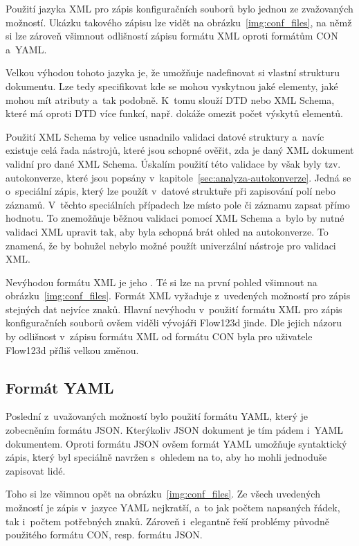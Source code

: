 \documentclass[FM,bw,DP]{tulthesis}
\begin{document}
Použití jazyka \gls{XML} pro zápis konfiguračních souborů bylo jednou ze zvažovaných možností. Ukázku takového zápisu lze vidět na obrázku~\ref{img:conf_files}, na němž si lze zároveň všimnout odlišností zápisu formátu XML oproti formátům \gls{CON} a~\gls{YAML}. 

Velkou výhodou tohoto jazyka je, že umožňuje nadefinovat si vlastní strukturu dokumentu. Lze tedy specifikovat kde se mohou vyskytnou jaké elementy, jaké mohou mít atributy a~tak podobně. K~tomu slouží \gls{DTD} nebo \gls{XML} Schema, které má oproti \gls{DTD} více funkcí, např. dokáže omezit počet výskytů elementů.

Použití \gls{XML} Schema by velice usnadnilo validaci datové struktury a~navíc existuje celá řada nástrojů, které jsou schopné ověřit, zda je daný \gls{XML} dokument validní pro dané \gls{XML} Schema. Úskalím použití této validace by však byly tzv. autokonverze, které jsou popsány v~kapitole~\ref{sec:analyza-autokonverze}. Jedná se o~speciální zápis, který lze použít v~datové struktuře při zapisování polí nebo záznamů. V~těchto speciálních případech lze místo pole či záznamu zapsat přímo hodnotu. To znemožňuje běžnou validaci pomocí XML Schema a~bylo by nutné validaci \gls{XML} upravit tak, aby byla schopná brát ohled na autokonverze. To znamená, že by bohužel nebylo možné použít univerzální nástroje pro validaci \gls{XML}.

Nevýhodou formátu \gls{XML} je jeho . Té si lze na první pohled všimnout na obrázku~\ref{img:conf_files}. Formát \gls{XML} vyžaduje z~uvedených možností pro zápis stejných dat nejvíce znaků. Hlavní nevýhodu v~použití formátu \gls{XML} pro zápis konfiguračních souborů ovšem viděli vývojáři Flow123d jinde. Dle jejich názoru by odlišnost v~zápisu formátu \gls{XML} od formátu \gls{CON} byla pro uživatele Flow123d příliš velkou změnou.

\subsection{Formát YAML}
\label{sec:problematika-format-yaml}

Poslední z~uvažovaných možností bylo použití formátu \gls{YAML}, který je zobecněním formátu \gls{JSON}. Kterýkoliv \gls{JSON} dokument je tím pádem i~\gls{YAML} dokumentem. Oproti formátu \gls{JSON} ovšem formát \gls{YAML} umožňuje syntaktický zápis, který byl speciálně navržen s~ohledem na to, aby ho mohli jednoduše zapisovat lidé.

Toho si lze všimnou opět na obrázku~\ref{img:conf_files}. Ze všech uvedených možností je zápis v~jazyce YAML nejkratší, a~to jak počtem napsaných řádek, tak i~počtem potřebných znaků. Zároveň i~elegantně řeší problémy původně použitého formátu \gls{CON}, resp. formátu \gls{JSON}.
\end{document}
